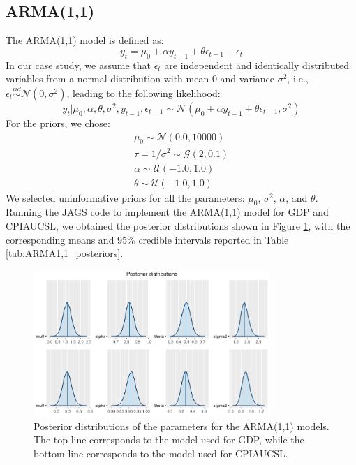 \subsection*{ARMA(1,1)}
The ARMA(1,1) model is defined as:
\begin{equation}
    \label{eq:ARMA1,1}
    y_{t} = \mu_{0} + \alpha y_{t-1} + \theta \epsilon_{t-1} + \epsilon_t
\end{equation}
In our case study, we assume that $\epsilon_t$ are independent and identically distributed variables from a normal distribution with mean $0$ and variance $\sigma^2$, i.e., $\epsilon_t \stackrel{iid}{\sim} \mathcal{N}(0,\sigma^2)$, leading to the following likelihood:
\begin{equation}
    \label{eq:ARMA1,1_likelihood}
    y_{t}|\mu_{0},\alpha,\theta,\sigma^2,y_{t-1},\epsilon_{t-1} \sim \mathcal{N}(\mu_{0} + \alpha y_{t-1} + \theta \epsilon_{t-1}, \sigma^2)
\end{equation}
For the priors, we chose:
\begin{equation}
    \label{eq:ARMA1,1_priors}
    \begin{split}
        \mu_0 \sim \mathcal{N}(0.0, 10000) \\
        \tau = 1 / \sigma^2 \sim \mathcal{G}(2, 0.1) \\
        \alpha \sim \mathcal{U}(-1.0, 1.0) \\
        \theta \sim \mathcal{U}(-1.0, 1.0)
    \end{split}
\end{equation}
We selected uninformative priors for all the parameters: $\mu_{0}$, $\sigma^2$, $\alpha$, and $\theta$. \\
Running the JAGS code to implement the ARMA(1,1) model for GDP and CPIAUCSL, we obtained the posterior distributions shown in Figure \ref{fig:ARMA1,1_posteriors}, with the corresponding means and 95\% credible intervals reported in Table \ref{tab:ARMA1,1_posteriors}.
\begin{figure}[H]
    \centering
    \includegraphics[width=0.8\textwidth]{images/4-ARMA/posteriors.png}
    \caption{Posterior distributions of the parameters for the ARMA(1,1) models. The top line corresponds to the model used for GDP, while the bottom line corresponds to the model used for CPIAUCSL.}
    \label{fig:ARMA1,1_posteriors}
\end{figure}
